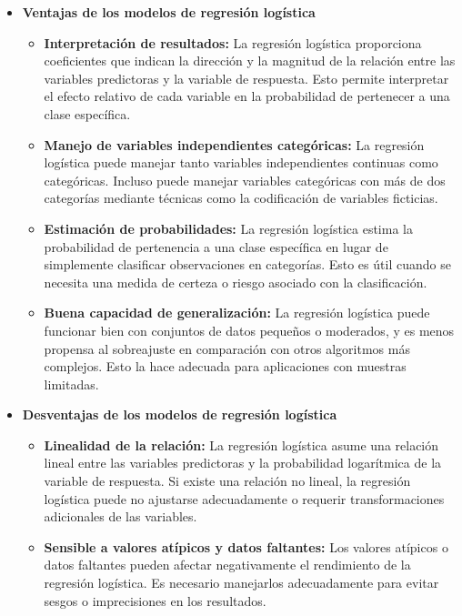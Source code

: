 \begin{itemize}
    \begin{itemize}
        \item \textbf{Ventajas de los modelos de regresión logística}
            \begin{itemize}
                \item \textbf{Interpretación de resultados:} La regresión logística proporciona coeficientes que indican la dirección y la magnitud de la relación entre las variables predictoras y la variable de respuesta. Esto permite interpretar el efecto relativo de cada variable en la probabilidad de pertenecer a una clase específica.
                \item \textbf{Manejo de variables independientes categóricas:} La regresión logística puede manejar tanto variables independientes continuas como categóricas. Incluso puede manejar variables categóricas con más de dos categorías mediante técnicas como la codificación de variables ficticias.
                \item \textbf{Estimación de probabilidades:} La regresión logística estima la probabilidad de pertenencia a una clase específica en lugar de simplemente clasificar observaciones en categorías. Esto es útil cuando se necesita una medida de certeza o riesgo asociado con la clasificación.
                \item \textbf{Buena capacidad de generalización:} La regresión logística puede funcionar bien con conjuntos de datos pequeños o moderados, y es menos propensa al sobreajuste en comparación con otros algoritmos más complejos. Esto la hace adecuada para aplicaciones con muestras limitadas.   
            \end{itemize}
        \item \textbf{Desventajas de los modelos de regresión logística}
            \begin{itemize}
                \item \textbf{Linealidad de la relación:} La regresión logística asume una relación lineal entre las variables predictoras y la probabilidad logarítmica de la variable de respuesta. Si existe una relación no lineal, la regresión logística puede no ajustarse adecuadamente o requerir transformaciones adicionales de las variables.
                \item \textbf{Sensible a valores atípicos y datos faltantes:} Los valores atípicos o datos faltantes pueden afectar negativamente el rendimiento de la regresión logística. Es necesario manejarlos adecuadamente para evitar sesgos o imprecisiones en los resultados.

\end{itemize}
\end{itemize}
\end{itemize}

